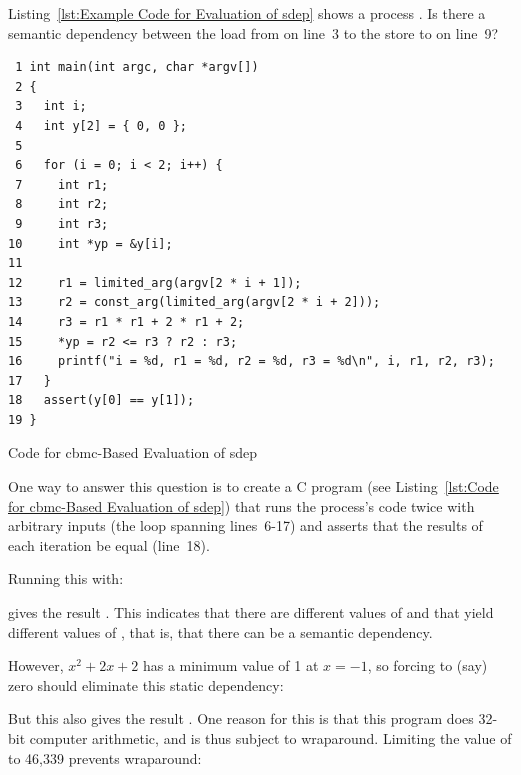 \documentclass[10]{article}
\begin{document}
Listing~\ref{lst:Example Code for Evaluation of sdep}
shows a  process .
Is there a semantic dependency between the load from  on
line~3 to the store to  on line~9?

\begin{listing}[tbp]
\scriptsize
\begin{verbatim}
 1 int main(int argc, char *argv[])
 2 {
 3   int i;
 4   int y[2] = { 0, 0 };
 5
 6   for (i = 0; i < 2; i++) {
 7     int r1;
 8     int r2;
 9     int r3;
10     int *yp = &y[i];
11
12     r1 = limited_arg(argv[2 * i + 1]);
13     r2 = const_arg(limited_arg(argv[2 * i + 2]));
14     r3 = r1 * r1 + 2 * r1 + 2;
15     *yp = r2 <= r3 ? r2 : r3;
16     printf("i = %d, r1 = %d, r2 = %d, r3 = %d\n", i, r1, r2, r3);
17   }
18   assert(y[0] == y[1]);
19 }
\end{verbatim}
\caption{Code for cbmc-Based Evaluation of sdep}
\label{lst:Code for cbmc-Based Evaluation of sdep}
\end{listing}

One way to answer this question is to create a C program
(see Listing~\ref{lst:Code for cbmc-Based Evaluation of sdep})
that runs the  process's code twice with arbitrary inputs
(the loop spanning lines~6-17) and asserts that the results of
each iteration be equal (line~18).

Running this with:

\begin{quote}
	\scriptsize
\end{quote}

gives the result .
This indicates that there are different values of  and 
that yield different values of , that is, that there can be
a semantic dependency.

However, $x^2 + 2x + 2$ has a minimum value of 1 at $x=-1$, so
forcing  to (say) zero should eliminate this static
dependency:

\begin{quote}
	\scriptsize
\end{quote}

But this also gives the result .
One reason for this is that this program does 32-bit computer arithmetic,
and is thus subject to wraparound.
Limiting the value of  to 46,339 prevents wraparound:

\begin{quote}
	\scriptsize
\end{quote}
\end{document}
